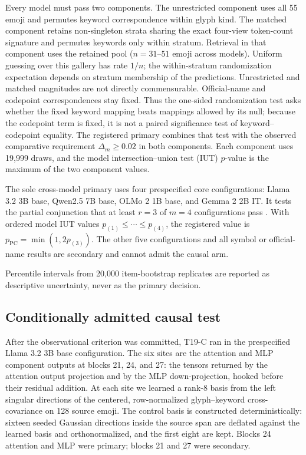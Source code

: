 \documentclass{article}
\begin{document}
Every model must pass two components. The unrestricted component uses all 55
emoji and permutes keyword correspondence within glyph kind. The matched
component retains non-singleton strata sharing the exact four-view
token-count signature and permutes keywords only within stratum. Retrieval in
that component uses the retained pool ($n=31$--$51$ emoji across models).
Uniform guessing over this gallery has rate $1/n$; the within-stratum
randomization expectation depends on stratum membership of the predictions.
Unrestricted and matched magnitudes are not directly commensurable.
Official-name and codepoint correspondences stay fixed.
Thus the one-sided randomization test asks whether the fixed keyword mapping
beats mappings allowed by its null; because the codepoint term is fixed, it is
not a paired significance test of keyword--codepoint equality. The registered
primary combines that test with the observed comparative requirement
$\Delta_m\geq0.02$ in both components.
Each component uses 19,999 draws, and the model intersection--union test
(IUT) $p$-value is the maximum of the two component values.

The sole cross-model primary uses four prespecified core configurations: Llama 3.2 3B base,
Qwen2.5 7B base, OLMo 2 1B base, and Gemma 2 2B IT. It tests the partial
conjunction that at least $r=3$ of $m=4$ configurations pass
\citep{benjamini2008partial}. With ordered model IUT values
$p_{(1)}\leq\cdots\leq p_{(4)}$, the registered value is
$p_{\mathrm{PC}}=\min(1,2p_{(3)})$. The other five configurations and all symbol or
official-name results are secondary and cannot admit the causal arm.

Percentile intervals from 20,000 item-bootstrap replicates are reported as
descriptive uncertainty, never as the primary decision.

\subsection{Conditionally admitted causal test}

After the observational criterion was committed, T19-C ran in the
prespecified Llama 3.2 3B base configuration. The six sites are the attention
and MLP component outputs at blocks 21, 24, and 27: the tensors returned by
the attention output projection and by the MLP down-projection, hooked before
their residual addition. At each site we learned a rank-8 basis from the left
singular directions of the centered, row-normalized glyph--keyword
cross-covariance on 128 source emoji. The control basis is constructed
deterministically: sixteen seeded Gaussian directions inside the source
span are deflated against the learned basis and orthonormalized, and the
first eight are kept. Blocks 24 attention and MLP were primary; blocks 21
and 27 were secondary.
\end{document}
